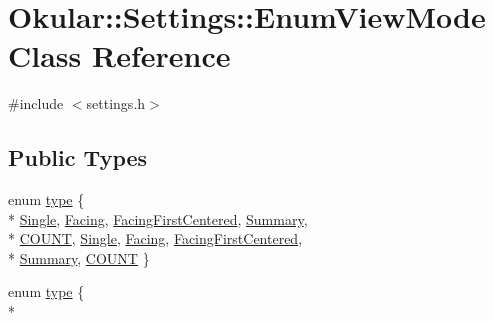 \hypertarget{classOkular_1_1Settings_1_1EnumViewMode}{\section{Okular\+:\+:Settings\+:\+:Enum\+View\+Mode Class Reference}
\label{classOkular_1_1Settings_1_1EnumViewMode}
}


{\ttfamily \#include $<$settings.\+h$>$}

\subsection*{Public Types}
\begin{DoxyCompactItemize}
\item 
enum \hyperlink{classOkular_1_1Settings_1_1EnumViewMode_a33bc89b0f0c02bd5539bad916569a665}{type} \{ \\*
\hyperlink{classOkular_1_1Settings_1_1EnumViewMode_a33bc89b0f0c02bd5539bad916569a665a7ae89daa45516a7920bf5ee4f15c8d27}{Single}, 
\hyperlink{classOkular_1_1Settings_1_1EnumViewMode_a33bc89b0f0c02bd5539bad916569a665ad6ce5fe491499be5fc070b0364e24287}{Facing}, 
\hyperlink{classOkular_1_1Settings_1_1EnumViewMode_a33bc89b0f0c02bd5539bad916569a665a9c6afefcdc8d9a813c22e4492a8eecfb}{Facing\+First\+Centered}, 
\hyperlink{classOkular_1_1Settings_1_1EnumViewMode_a33bc89b0f0c02bd5539bad916569a665a6551656e4f96799c3792390290c061fb}{Summary}, 
\\*
\hyperlink{classOkular_1_1Settings_1_1EnumViewMode_a33bc89b0f0c02bd5539bad916569a665a64c8d46060705f0b7f399a65a41a9782}{C\+O\+U\+N\+T}, 
\hyperlink{classOkular_1_1Settings_1_1EnumViewMode_a33bc89b0f0c02bd5539bad916569a665a7ae89daa45516a7920bf5ee4f15c8d27}{Single}, 
\hyperlink{classOkular_1_1Settings_1_1EnumViewMode_a33bc89b0f0c02bd5539bad916569a665ad6ce5fe491499be5fc070b0364e24287}{Facing}, 
\hyperlink{classOkular_1_1Settings_1_1EnumViewMode_a33bc89b0f0c02bd5539bad916569a665a9c6afefcdc8d9a813c22e4492a8eecfb}{Facing\+First\+Centered}, 
\\*
\hyperlink{classOkular_1_1Settings_1_1EnumViewMode_a33bc89b0f0c02bd5539bad916569a665a6551656e4f96799c3792390290c061fb}{Summary}, 
\hyperlink{classOkular_1_1Settings_1_1EnumViewMode_a33bc89b0f0c02bd5539bad916569a665a64c8d46060705f0b7f399a65a41a9782}{C\+O\+U\+N\+T}
 \}
\item 
enum \hyperlink{classOkular_1_1Settings_1_1EnumViewMode_a33bc89b0f0c02bd5539bad916569a665}{type} \{ \\*

\end{DoxyCompactItemize}
